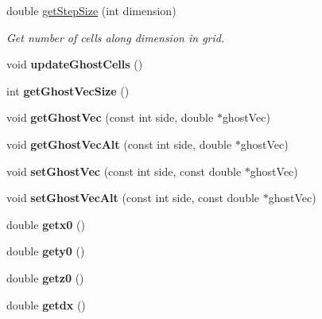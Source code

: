 \begin{DoxyCompactItemize}
double \hyperlink{class_grid_a7c37daac383190622c7cf37597101510}{get\+Step\+Size} (int dimension)
\begin{DoxyCompactList}\small\item\em Get number of cells along dimension in grid. \end{DoxyCompactList}\item 
\hypertarget{class_grid_ae677a62490f6c432895e2ac38e9c0ef8}{}\label{class_grid_ae677a62490f6c432895e2ac38e9c0ef8} 
void {\bfseries update\+Ghost\+Cells} ()
\item 
\hypertarget{class_grid_a3ec170bd98cf658e567ac0d6a4975ceb}{}\label{class_grid_a3ec170bd98cf658e567ac0d6a4975ceb} 
int {\bfseries get\+Ghost\+Vec\+Size} ()
\item 
\hypertarget{class_grid_a768ae91746ecfc1d7b9172c431ecf45c}{}\label{class_grid_a768ae91746ecfc1d7b9172c431ecf45c} 
void {\bfseries get\+Ghost\+Vec} (const int side, double $\ast$ghost\+Vec)
\item 
\hypertarget{class_grid_a606fe5333db63f24d270a0546608f1f4}{}\label{class_grid_a606fe5333db63f24d270a0546608f1f4} 
void {\bfseries get\+Ghost\+Vec\+Alt} (const int side, double $\ast$ghost\+Vec)
\item 
\hypertarget{class_grid_aa24065a7d9fedd06cdb78a4c81c44b79}{}\label{class_grid_aa24065a7d9fedd06cdb78a4c81c44b79} 
void {\bfseries set\+Ghost\+Vec} (const int side, const double $\ast$ghost\+Vec)
\item 
\hypertarget{class_grid_a5d47f8db0c280c26467b5a91465b7d40}{}\label{class_grid_a5d47f8db0c280c26467b5a91465b7d40} 
void {\bfseries set\+Ghost\+Vec\+Alt} (const int side, const double $\ast$ghost\+Vec)
\item 
\hypertarget{class_grid_ab6866ceb9a38b1b68d587db5cd343bba}{}\label{class_grid_ab6866ceb9a38b1b68d587db5cd343bba} 
double {\bfseries getx0} ()
\item 
\hypertarget{class_grid_abde253b5f588c41e5fef6151052ca2ab}{}\label{class_grid_abde253b5f588c41e5fef6151052ca2ab} 
double {\bfseries gety0} ()
\item 
\hypertarget{class_grid_a0e89654502e992253544fc200387272b}{}\label{class_grid_a0e89654502e992253544fc200387272b} 
double {\bfseries getz0} ()
\item 
\hypertarget{class_grid_a800957fe9d9d5ea65ee324fec80351af}{}\label{class_grid_a800957fe9d9d5ea65ee324fec80351af} 
double {\bfseries getdx} ()
\item 
\hypertarget{class_grid_af8a59161f00b54b18f9a472447cfdca4}{}\label{class_grid_af8a59161f00b54b18f9a472447cfdca4} 

\end{DoxyCompactItemize}
